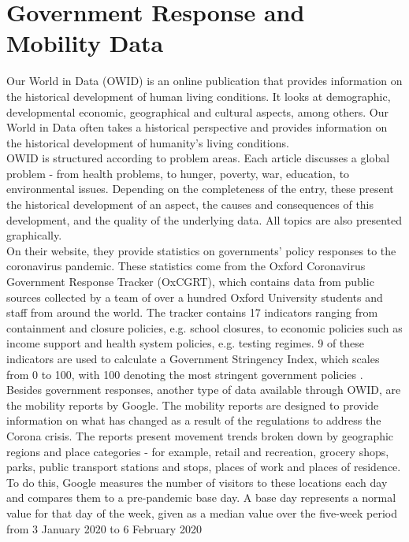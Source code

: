 \section{Government Response and Mobility Data}
Our World in Data (OWID) is an online publication that provides information on the historical development of human living conditions. It looks at demographic, developmental economic, geographical and cultural aspects, among others. Our World in Data often takes a historical perspective and provides information on the historical development of humanity's living conditions. \\
OWID is structured according to problem areas. Each article discusses a global problem - from health problems, to hunger, poverty, war, education, to environmental issues. Depending on the completeness of the entry, these present the historical development of an aspect, the causes and consequences of this development, and the quality of the underlying data. All topics are also presented graphically. \\
On their website, they provide statistics on governments' policy responses to the coronavirus pandemic. These statistics come from the Oxford Coronavirus Government Response Tracker (OxCGRT), which contains data from public sources collected by a team of over a hundred Oxford University students and staff from around the world. The tracker contains 17 indicators ranging from containment and closure policies, e.g. school closures, to economic policies such as income support and health system policies, e.g. testing regimes. 9 of these indicators are used to calculate a Government Stringency Index, which scales from 0 to 100, with 100 denoting the most stringent government policies \autocite[][]{hale2020variation, ritchie2020coronavirus}. \\
Besides government responses, another type of data available through OWID, are the mobility reports by Google. The mobility reports are designed to provide information on what has changed as a result of the regulations to address the Corona crisis. The reports present movement trends broken down by geographic regions and place categories - for example, retail and recreation, grocery shops, parks, public transport stations and stops, places of work and places of residence. To do this, Google measures the number of visitors to these locations each day and compares them to a pre-pandemic base day. A base day represents a normal value for that day of the week, given as a median value over the five-week period from 3 January 2020 to 6 February 2020 \autocite[][]{googlemobility, ritchie2020coronavirus}
\clearpage
